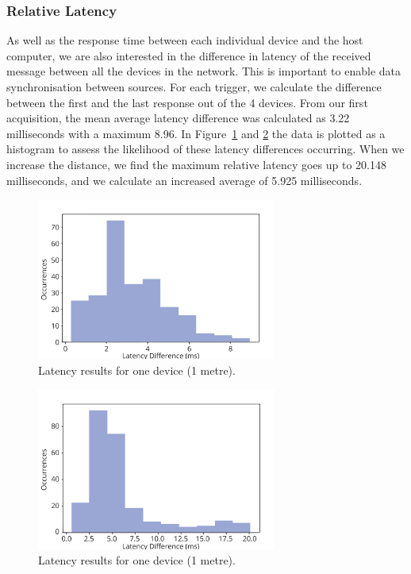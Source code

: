 \subsubsection*{Relative Latency}

As well as the response time between each individual device and the host computer, we are also interested in the difference in latency of the received message between all the devices in the network. This is important to enable data synchronisation between sources. For each trigger, we calculate the difference between the first and the last response out of the 4 devices. From our first acquisition, the mean average latency difference was calculated as 3.22 milliseconds with a maximum 8.96. In Figure~\ref{fig:latency_fig6} and \ref{fig:latency_fig7} the data is plotted as a histogram to assess the likelihood of these latency differences occurring. When we increase the distance, we find the maximum relative latency goes up to 20.148 milliseconds, and we calculate an increased average of 5.925 milliseconds.

\begin{figure}[htbp]
  \centering
    \includegraphics[width=0.7\textwidth]{Chapters/Figures/technical/Latency/figure6.png}
    \caption{Latency results for one device (1 metre).}
    \label{fig:latency_fig6}
\end{figure}

\begin{figure}[htbp]
  \centering
    \includegraphics[width=0.7\textwidth]{Chapters/Figures/technical/Latency/figure7.png}
    \caption{Latency results for one device (1 metre).}
    \label{fig:latency_fig7}
\end{figure}

